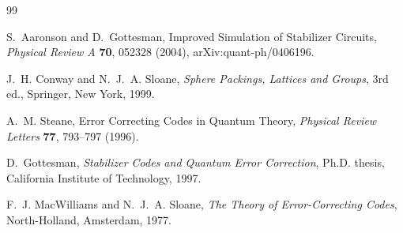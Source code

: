 \documentclass[11pt,a4paper]{article}
\theoremstyle{definition}
\theoremstyle{remark}
\begin{document}
\begin{thebibliography}{99}

S.~Aaronson and D.~Gottesman,
\newblock Improved Simulation of Stabilizer Circuits,
\newblock \emph{Physical Review A} \textbf{70}, 052328 (2004),
\newblock arXiv:quant-ph/0406196.

J.~H. Conway and N.~J.~A. Sloane,
\newblock \emph{Sphere Packings, Lattices and Groups},
\newblock 3rd ed., Springer, New York, 1999.

A.~M. Steane,
\newblock Error Correcting Codes in Quantum Theory,
\newblock \emph{Physical Review Letters} \textbf{77},
793--797 (1996).

D.~Gottesman,
\newblock \emph{Stabilizer Codes and Quantum Error Correction},
\newblock Ph.D. thesis, California Institute of Technology, 1997.

F.~J. MacWilliams and N.~J.~A. Sloane,
\newblock \emph{The Theory of Error-Correcting Codes},
\newblock North-Holland, Amsterdam, 1977.

\end{thebibliography}
\end{document}
